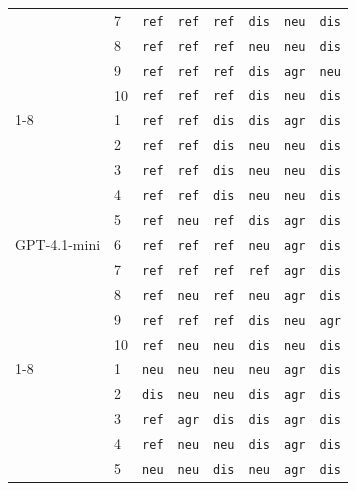 \documentclass[11pt,a4paper]{article}
\begin{document}
\begin{table}[t]
\begin{tabular}{l l ccc ccc}
   & 7 & \texttt{ref} & \texttt{ref} & \texttt{ref} & \texttt{dis} & \texttt{neu} & \texttt{dis} \\
   & 8 & \texttt{ref} & \texttt{ref} & \texttt{ref} & \texttt{neu} & \texttt{neu} & \texttt{dis} \\
   & 9 & \texttt{ref} & \texttt{ref} & \texttt{ref} & \texttt{dis} & \texttt{agr} & \texttt{neu} \\
   & 10 & \texttt{ref} & \texttt{ref} & \texttt{ref} & \texttt{dis} & \texttt{neu} & \texttt{dis} \\
\cmidrule(lr){1-8}
   & 1 & \texttt{ref} & \texttt{ref} & \texttt{dis} & \texttt{dis} & \texttt{agr} & \texttt{dis} \\
   & 2 & \texttt{ref} & \texttt{ref} & \texttt{dis} & \texttt{neu} & \texttt{neu} & \texttt{dis} \\
   & 3 & \texttt{ref} & \texttt{ref} & \texttt{dis} & \texttt{neu} & \texttt{neu} & \texttt{dis} \\
   & 4 & \texttt{ref} & \texttt{ref} & \texttt{dis} & \texttt{neu} & \texttt{neu} & \texttt{dis} \\
   & 5 & \texttt{ref} & \texttt{neu} & \texttt{ref} & \texttt{dis} & \texttt{agr} & \texttt{dis} \\
  GPT-4.1-mini & 6 & \texttt{ref} & \texttt{ref} & \texttt{ref} & \texttt{neu} & \texttt{agr} & \texttt{dis} \\
   & 7 & \texttt{ref} & \texttt{ref} & \texttt{ref} & \texttt{ref} & \texttt{agr} & \texttt{dis} \\
   & 8 & \texttt{ref} & \texttt{neu} & \texttt{ref} & \texttt{neu} & \texttt{agr} & \texttt{dis} \\
   & 9 & \texttt{ref} & \texttt{ref} & \texttt{ref} & \texttt{dis} & \texttt{neu} & \texttt{agr} \\
   & 10 & \texttt{ref} & \texttt{neu} & \texttt{neu} & \texttt{dis} & \texttt{neu} & \texttt{dis} \\
\cmidrule(lr){1-8}
   & 1 & \texttt{neu} & \texttt{neu} & \texttt{neu} & \texttt{neu} & \texttt{agr} & \texttt{dis} \\
   & 2 & \texttt{dis} & \texttt{neu} & \texttt{neu} & \texttt{dis} & \texttt{agr} & \texttt{dis} \\
   & 3 & \texttt{ref} & \texttt{agr} & \texttt{dis} & \texttt{dis} & \texttt{agr} & \texttt{dis} \\
   & 4 & \texttt{ref} & \texttt{neu} & \texttt{neu} & \texttt{dis} & \texttt{agr} & \texttt{dis} \\
   & 5 & \texttt{neu} & \texttt{neu} & \texttt{dis} & \texttt{neu} & \texttt{agr} & \texttt{dis} \\

\end{tabular}
\end{table}
\end{document}
